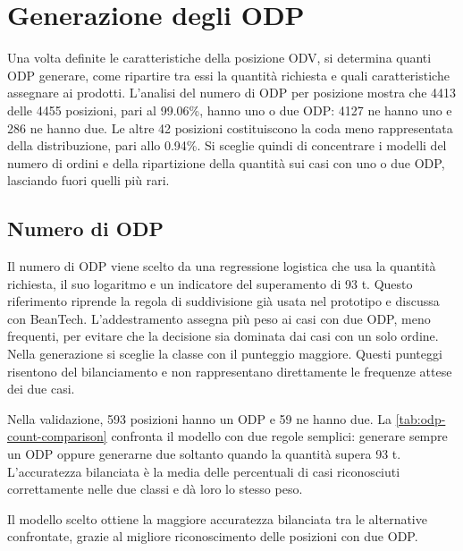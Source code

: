 \section{Generazione degli ODP}
\label{sec:odp-generation}

Una volta definite le caratteristiche della posizione ODV, si determina quanti ODP generare, come ripartire tra essi la quantità richiesta e quali caratteristiche assegnare ai prodotti. L’analisi del numero di ODP per posizione mostra che \num{4413} delle \num{4455} posizioni, pari al \num{99.06}\%, hanno uno o due ODP: \num{4127} ne hanno uno e 286 ne hanno due. Le altre 42 posizioni costituiscono la coda meno rappresentata della distribuzione, pari allo \num{0.94}\%. Si sceglie quindi di concentrare i modelli del numero di ordini e della ripartizione della quantità sui casi con uno o due ODP, lasciando fuori quelli più rari.

\subsection{Numero di ODP}
\label{sec:odp-count-generation}

Il numero di ODP viene scelto da una regressione logistica che usa la quantità richiesta, il suo logaritmo e un indicatore del superamento di 93 t. Questo riferimento riprende la regola di suddivisione già usata nel prototipo e discussa con BeanTech. L'addestramento assegna più peso ai casi con due ODP, meno frequenti, per evitare che la decisione sia dominata dai casi con un solo ordine. Nella generazione si sceglie la classe con il punteggio maggiore. Questi punteggi risentono del bilanciamento e non rappresentano direttamente le frequenze attese dei due casi.

Nella validazione, 593 posizioni hanno un ODP e 59 ne hanno due. La \cref{tab:odp-count-comparison} confronta il modello con due regole semplici: generare sempre un ODP oppure generarne due soltanto quando la quantità supera 93 t. L'accuratezza bilanciata è la media delle percentuali di casi riconosciuti correttamente nelle due classi e dà loro lo stesso peso.



Il modello scelto ottiene la maggiore accuratezza bilanciata tra le alternative confrontate, grazie al migliore riconoscimento delle posizioni con due ODP.

